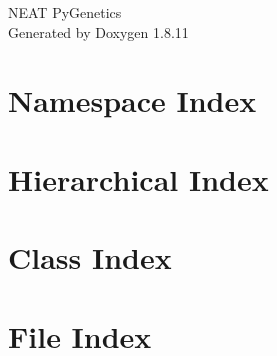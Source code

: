 \documentclass[twoside]{book}
\newcommand{\+}{\discretionary{\mbox{\scriptsize$\hookleftarrow$}}{}{}}
\newcommand{\clearemptydoublepage}{%
  \newpage{\pagestyle{empty}\cleardoublepage}%
}
\begin{document}
\hypersetup{pageanchor=false,
             bookmarksnumbered=true,
             pdfencoding=unicode
            }
\begin{titlepage}
\vspace*{7cm}
\begin{center}%
{\Large N\+E\+AT Py\+Genetics }\\
\vspace*{1cm}
{\large Generated by Doxygen 1.8.11}\\
\end{center}
\end{titlepage}
\clearemptydoublepage
\tableofcontents
\clearemptydoublepage
{}
\hypersetup{pageanchor=true}

\chapter{Namespace Index}

\chapter{Hierarchical Index}

\chapter{Class Index}

\chapter{File Index}

\end{document}
